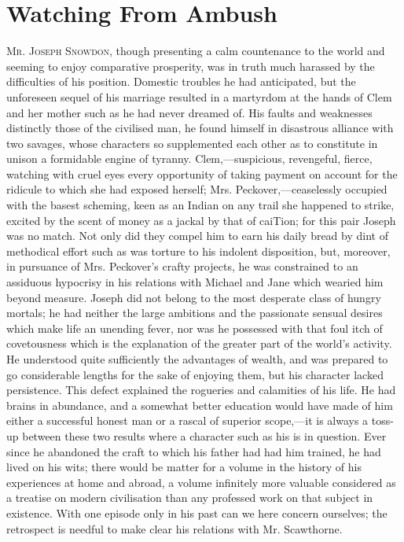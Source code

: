 \chapter{Watching From Ambush}

\textsc{Mr. Joseph Snowdon}, though presenting a calm countenance to the
world and seeming to enjoy comparative prosperity, was in truth much
harassed by the difficulties of his position. Domestic troubles he had
anticipated, but the unforeseen sequel of his marriage resulted in a
martyrdom at the hands of Clem and her mother such as he had never
dreamed of. His faults and weaknesses distinctly those of the civilised
man, he found himself in disastrous alliance with two savages, whose
characters so supplemented each other as to constitute in unison a
formidable engine of tyranny. Clem,---suspicious, revengeful, fierce,
watching with cruel eyes every opportunity of taking payment on account
for the ridicule to which she had exposed herself;
{\protect\hypertarget{175}{}{}}Mrs. Peckover,---ceaselessly occupied
with the basest scheming, keen as an Indian on any trail she happened to
strike, excited by the scent of money as a jackal by that of caiTion;
for this pair Joseph was no match. Not only did they compel him to earn
his daily bread by dint of methodical effort such as was torture to his
indolent disposition, but, moreover, in pursuance of Mrs. Peckover's
crafty projects, he was constrained to an assiduous hypocrisy in his
relations with Michael and Jane which wearied him beyond measure. Joseph
did not belong to the most desperate class of hungry mortals; he had
neither the large ambitions and the passionate sensual desires which
make life an unending fever, nor was he possessed with that foul itch of
covetousness which is the explanation of the greater part of the world's
activity. He understood quite sufficiently the advantages of wealth, and
was prepared to go considerable lengths for the sake of enjoying them,
but his character lacked persistence. This defect explained the
rogueries and calamities of his {\protect\hypertarget{176}{}{}}life. He
had brains in abundance, and a somewhat better education would have made
of him either a successful honest man or a rascal of superior
scope,---it is always a toss-up between these two results where a
character such as his is in question. Ever since he abandoned the craft
to which his father had had him trained, he had lived on his wits; there
would be matter for a volume in the history of his experiences at home
and abroad, a volume infinitely more valuable considered as a treatise
on modern civilisation than any professed work on that subject in
existence. With one episode only in his past can we here concern
ourselves; the retrospect is needful to make clear his relations with
Mr. Scawthorne.

